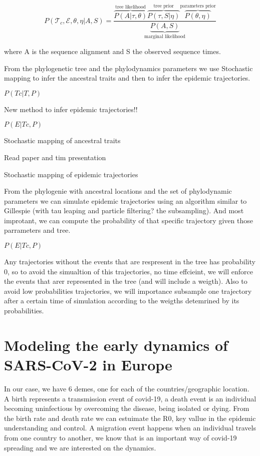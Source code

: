 \begin{equation}
P(\mathcal{T}_c, \mathcal{E}, \theta, \eta | A, S) = \frac{\overbrace{P(A | \tau, \theta)}^{\text{tree likelihood}} \overbrace{P(\tau, S | \eta)}^{\text{tree prior}} \overbrace{P(\theta, \eta)}^{\text{parameters prior}}}{\underbrace{P(A, S)}_{\text{marginal likelihood}}}
\end{equation}

where A is the sequence alignment and S the observed sequence times.


From the phylogenetic tree and the phylodynamics parameters we use Stochastic mapping to infer the ancestral traits and then to infer the epidemic trajectories.

$P(Tc | T, P)$

New method to infer epidemic trajectories!!

$P(E | Tc, P)$

Stochastic mapping of ancestral traits

Read paper and tim presentation

Stochastic mapping of epidemic trajectories

From the phylogenie with ancestral locations and the set of phylodynamic parameters we can simulate epidemic trajectories using an algorithm similar to Gillespie (with tau leaping and particle filtering? the subsampling). And most improtant, we can compute the probability of that specific trajectory given those parrameters and tree. 

$P(E|Tc, P)$

Any trajectories without the events that are respresent in the tree has probability 0, so to avoid the simualtion of this trajectories, no time effcieint, we will enforce the events that arer represented in the tree (and will include a weigth). Also to avoid low probabilities trajectories, we will importance subsample one trajectory after a certain time of simulation according to the weigths detemrined by its probabilities. 


\section{Modeling the early dynamics of SARS-CoV-2 in Europe}

In our case, we have 6 demes, one for each of the countries/geographic location. A birth represents a transmission event of covid-19, a death event is an individual becoming uninfectious by overcoming the disease, being isolated or dying. From the birth rate and death rate we can estuimate the R0, key vallue in the epidemic understanding and control. A migration event happens when an individual travels from one country to another, we know that is an important way of covid-19 spreading and we are interested on the dynamics. 

